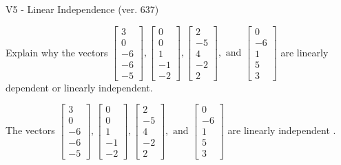 \begin{exercise}
  \begin{exerciseTitle}V5 - Linear Independence (ver. 637)\end{exerciseTitle}
  \begin{exerciseStatement}
    Explain why the vectors \(\left[\begin{array}{r}
3 \\
0 \\
-6 \\
-6 \\
-5
\end{array}\right] , \left[\begin{array}{r}
0 \\
0 \\
1 \\
-1 \\
-2
\end{array}\right] , \left[\begin{array}{r}
2 \\
-5 \\
4 \\
-2 \\
2
\end{array}\right] , \text{ and } \left[\begin{array}{r}
0 \\
-6 \\
1 \\
5 \\
3
\end{array}\right]\) are linearly dependent or linearly independent.	


  \end{exerciseStatement}
  \begin{exerciseAnswer}
   The vectors \(\left[\begin{array}{r}
3 \\
0 \\
-6 \\
-6 \\
-5
\end{array}\right] , \left[\begin{array}{r}
0 \\
0 \\
1 \\
-1 \\
-2
\end{array}\right] , \left[\begin{array}{r}
2 \\
-5 \\
4 \\
-2 \\
2
\end{array}\right] , \text{ and } \left[\begin{array}{r}
0 \\
-6 \\
1 \\
5 \\
3
\end{array}\right]\) are 
  	 linearly independent  .
  


  \end{exerciseAnswer}
\end{exercise}